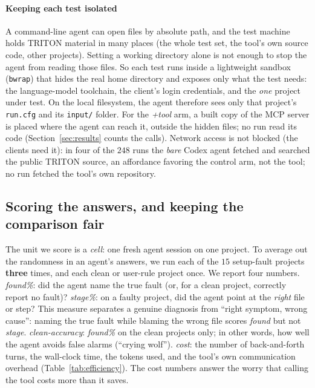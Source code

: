 \documentclass[conference]{IEEEtran}
\begin{document}
\paragraph{Keeping each test isolated} A command-line agent can open files by absolute path, and
the test machine holds TRITON material in many places (the whole test set, the tool's own source
code, other projects). Setting a working directory alone is not enough to stop the agent from
reading those files. So each test runs inside a lightweight sandbox (\texttt{bwrap}) that hides
the real home directory and exposes only what the test needs: the language-model toolchain, the
client's login credentials, and the \emph{one} project under test. On the local filesystem, the
agent therefore sees only that project's \texttt{run.cfg} and its \texttt{input/} folder. For the \emph{+tool} arm, a
built copy of the MCP server is placed where the agent can reach it, outside the hidden files;
no run read its code (Section~\ref{sec:results} counts the calls). Network access is
not blocked (the clients need it): in four of the $248$ runs the \emph{bare} Codex agent fetched
and searched the public TRITON source, an affordance favoring the control arm, not the tool; no
run fetched the tool's own repository.

\subsection{Scoring the answers, and keeping the comparison fair}
\label{sec:scoring}
The unit we score is a \emph{cell}: one fresh agent session on one project. To average out the
randomness in an agent's answers, we run each of the $15$ setup-fault projects \textbf{three} times, and each clean
or user-rule project once. We report four numbers. \emph{found\%}: did the agent name the true
fault (or, for a clean project, correctly report no fault)? \emph{stage\%}: on a faulty project,
did the agent point at the \emph{right} file or step? This measure separates a genuine diagnosis
from ``right symptom, wrong cause'': naming the true fault while blaming the wrong file scores
\emph{found} but not \emph{stage}.
\emph{clean-accuracy}: \emph{found\%} on the clean projects only; in other words, how well the
agent avoids false alarms (``crying wolf''). \emph{cost}: the number of back-and-forth turns, the
wall-clock time, the tokens used, and the tool's own communication overhead
(Table~\ref{tab:efficiency}). The cost numbers answer the worry that calling the tool costs more
than it saves.
\end{document}
